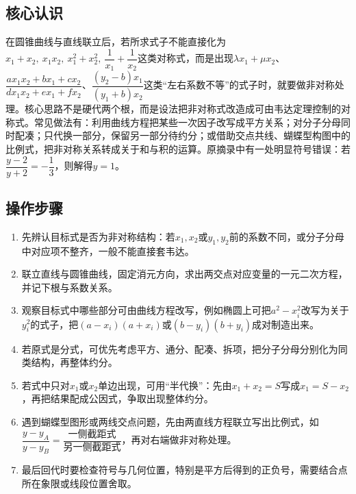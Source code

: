 \documentclass[UTF8,a4paper,11pt]{ctexart}
\begin{document}
\subsection*{核心认识}

在圆锥曲线与直线联立后，若所求式子不能直接化为$x_1+x_2,\ x_1x_2,\ x_1^2+x_2^2,\ \dfrac1{x_1}+\dfrac1{x_2}$这类对称式，而是出现$\lambda x_1+\mu x_2$、$\dfrac{ax_1x_2+bx_1+cx_2}{dx_1x_2+ex_1+fx_2}$、$\dfrac{(y_2-b)x_1}{(y_1+b)x_2}$这类“左右系数不等”的式子时，就要做非对称处理。核心思路不是硬代两个根，而是设法把非对称式改造成可由韦达定理控制的对称式。常见做法有：利用曲线方程把某些一次因子改写成平方关系；对分子分母同时配凑；只代换一部分，保留另一部分待约分；或借助交点共线、蝴蝶型构图中的比例式，把非对称关系转成关于和与积的运算。原摘录中有一处明显符号错误：若$\dfrac{y-2}{y+2}=-\dfrac13$，则解得$y=1$。

\subsection*{操作步骤}

\begin{enumerate}

\item 先辨认目标式是否为非对称结构：若$x_1,x_2$或$y_1,y_2$前的系数不同，或分子分母中对应项不整齐，一般不能直接套韦达。

\item 联立直线与圆锥曲线，固定消元方向，求出两交点对应变量的一元二次方程，并记下根与系数关系。

\item 观察目标式中哪些部分可由曲线方程改写，例如椭圆上可把$a^2-x_i^2$改写为关于$y_i^2$的式子，把$(a-x_i)(a+x_i)$或$(b-y_i)(b+y_i)$成对制造出来。

\item 若原式是分式，可优先考虑平方、通分、配凑、拆项，把分子分母分别化为同类结构，再整体约分。

\item 若式中只对$x_1$或$x_2$单边出现，可用“半代换”：先由$x_1+x_2=S$写成$x_1=S-x_2$，再把结果配成公因式，争取出现整体约分。

\item 遇到蝴蝶型图形或两线交点问题，先由两直线方程联立写出比例式，如$\dfrac{y-y_A}{y-y_B}=\dfrac{\text{一侧截距式}}{\text{另一侧截距式}}$，再对右端做非对称处理。

\item 最后回代时要检查符号与几何位置，特别是平方后得到的正负号，需要结合点所在象限或线段位置舍取。

\end{enumerate}
\end{document}
